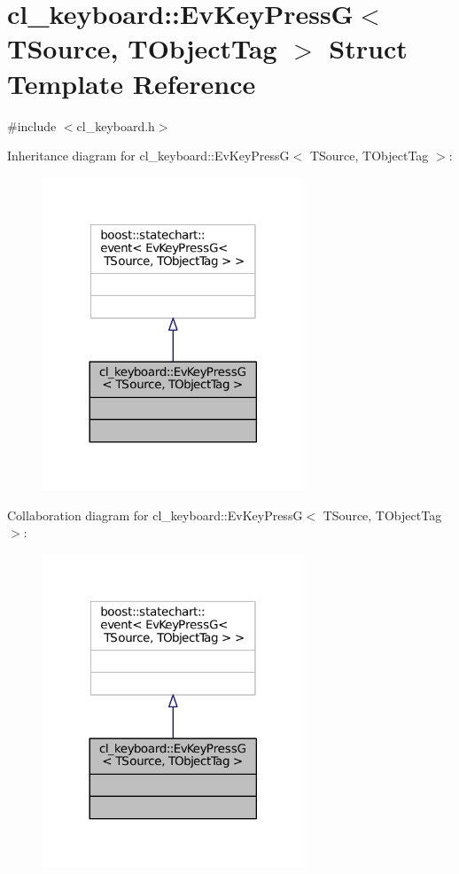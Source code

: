\hypertarget{structcl__keyboard_1_1EvKeyPressG}{}\section{cl\+\_\+keyboard\+:\+:Ev\+Key\+PressG$<$ T\+Source, T\+Object\+Tag $>$ Struct Template Reference}
\label{structcl__keyboard_1_1EvKeyPressG}


{\ttfamily \#include $<$cl\+\_\+keyboard.\+h$>$}



Inheritance diagram for cl\+\_\+keyboard\+:\+:Ev\+Key\+PressG$<$ T\+Source, T\+Object\+Tag $>$\+:
\nopagebreak
\begin{figure}[H]
\begin{center}
\leavevmode
\includegraphics[width=221pt]{structcl__keyboard_1_1EvKeyPressG__inherit__graph}
\end{center}
\end{figure}


Collaboration diagram for cl\+\_\+keyboard\+:\+:Ev\+Key\+PressG$<$ T\+Source, T\+Object\+Tag $>$\+:
\nopagebreak
\begin{figure}[H]
\begin{center}
\leavevmode
\includegraphics[width=221pt]{structcl__keyboard_1_1EvKeyPressG__coll__graph}
\end{center}
\end{figure}



